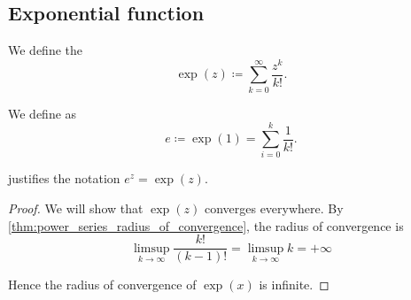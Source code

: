 \subsection{Exponential function}\label{subsec:exponential_function}

\begin{definition}\label{def:exponential_function}
  We define the 
  \begin{equation}\label{def:exponential_function/series}
    \exp(z) \coloneqq \sum_{k=0}^\infty \frac {z^k} {k!}.
  \end{equation}

  We define  as
  \begin{equation*}
    e \coloneqq \exp(1) = \sum_{i=0}^k \frac 1 {k!}.
  \end{equation*}

   justifies the notation \( e^z = \exp(z) \).
\end{definition}
\begin{proof}
  We will show that \( \exp(z) \) converges everywhere. By \cref{thm:power_series_radius_of_convergence}, the radius of convergence is
  \begin{equation*}
    \limsup_{k \to \infty} \frac {k!} {(k-1)!}
    =
    \limsup_{k \to \infty} k
    =
    +\infty
  \end{equation*}

  Hence the radius of convergence of \( \exp(x) \) is infinite.
\end{proof}


